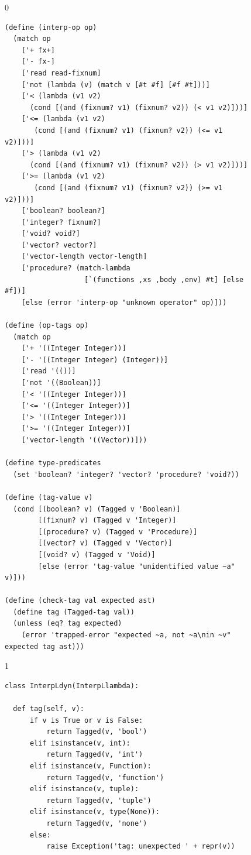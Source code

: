 \documentclass[7x10]{TimesAPriori_MIT}%
\def\racketEd{0}
\def\pythonEd{1}
\def\edition{0}
\numberwithin{theorem}{chapter}
\numberwithin{definition}{chapter}
\numberwithin{equation}{chapter}
\begin{document}
\begin{figure}[tbp]
  \begin{tcolorbox}[colback=white]
    {\if\edition\racketEd
\begin{lstlisting}[basicstyle=\ttfamily\footnotesize]
(define (interp-op op)
  (match op
    ['+ fx+]
    ['- fx-]
    ['read read-fixnum]
    ['not (lambda (v) (match v [#t #f] [#f #t]))]
    ['< (lambda (v1 v2)
	  (cond [(and (fixnum? v1) (fixnum? v2)) (< v1 v2)]))]
    ['<= (lambda (v1 v2)
	   (cond [(and (fixnum? v1) (fixnum? v2)) (<= v1 v2)]))]
    ['> (lambda (v1 v2)
	  (cond [(and (fixnum? v1) (fixnum? v2)) (> v1 v2)]))]
    ['>= (lambda (v1 v2)
	   (cond [(and (fixnum? v1) (fixnum? v2)) (>= v1 v2)]))]
    ['boolean? boolean?]
    ['integer? fixnum?]
    ['void? void?]
    ['vector? vector?]
    ['vector-length vector-length]
    ['procedure? (match-lambda
                   [`(functions ,xs ,body ,env) #t] [else #f])]
    [else (error 'interp-op "unknown operator" op)]))

(define (op-tags op)
  (match op
    ['+ '((Integer Integer))]
    ['- '((Integer Integer) (Integer))]
    ['read '(())]
    ['not '((Boolean))]
    ['< '((Integer Integer))]
    ['<= '((Integer Integer))]
    ['> '((Integer Integer))]
    ['>= '((Integer Integer))]
    ['vector-length '((Vector))]))

(define type-predicates
  (set 'boolean? 'integer? 'vector? 'procedure? 'void?))

(define (tag-value v)
  (cond [(boolean? v) (Tagged v 'Boolean)]
        [(fixnum? v) (Tagged v 'Integer)]
        [(procedure? v) (Tagged v 'Procedure)]
        [(vector? v) (Tagged v 'Vector)]
        [(void? v) (Tagged v 'Void)]
        [else (error 'tag-value "unidentified value ~a" v)]))

(define (check-tag val expected ast)
  (define tag (Tagged-tag val))
  (unless (eq? tag expected)
    (error 'trapped-error "expected ~a, not ~a\nin ~v" expected tag ast)))
\end{lstlisting}
\fi}
{\if\edition\pythonEd
\begin{lstlisting}[basicstyle=\ttfamily\footnotesize]
class InterpLdyn(InterpLlambda):
  
  def tag(self, v):
      if v is True or v is False:
          return Tagged(v, 'bool')
      elif isinstance(v, int):
          return Tagged(v, 'int')
      elif isinstance(v, Function):
          return Tagged(v, 'function')
      elif isinstance(v, tuple):
          return Tagged(v, 'tuple')
      elif isinstance(v, type(None)):
          return Tagged(v, 'none')
      else:
          raise Exception('tag: unexpected ' + repr(v))


\end{lstlisting}}
\end{tcolorbox}
\end{figure}
\end{document}
